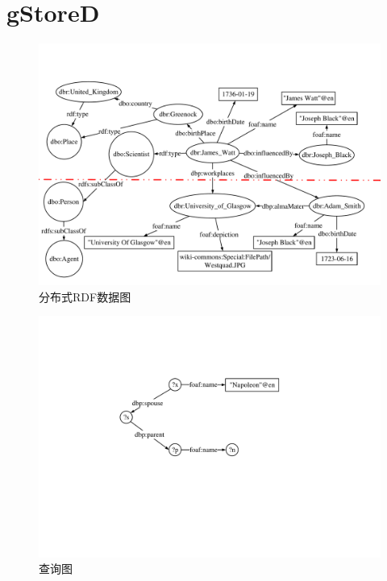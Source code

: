 \chapter{gStoreD}\label{sec:gStoreD}



\begin{figure}
\begin{center}
   \includegraphics[width=12cm]{./figures/part3/distributed_data_graph.pdf}
    \caption{分布式RDF数据图}
   \label{fig:distributeddatagraph}
\end{center}
\end{figure}

\begin{figure}
\begin{center}
   \includegraphics[width=12cm]{./figures/part3/distributed_query_graph.pdf}
    \caption{查询图}
   \label{fig:querygrpahgStoreD}
\end{center}
\end{figure}